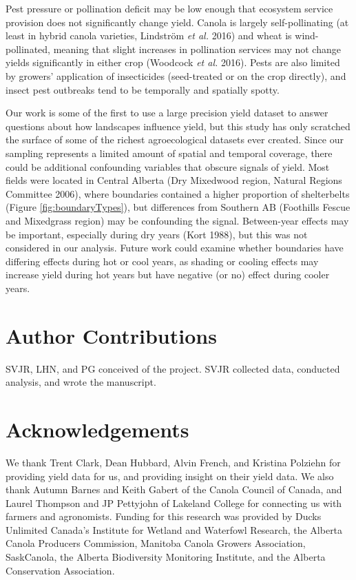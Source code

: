\documentclass[]{elsarticle} %
\begin{document}
Pest pressure or pollination deficit may be low enough that ecosystem service provision does not significantly change yield.
Canola is largely self-pollinating (at least in hybrid canola varieties, Lindström \emph{et al.} 2016) and wheat is wind-pollinated, meaning that slight increases in pollination services may not change yields significantly in either crop (Woodcock \emph{et al.} 2016).
Pests are also limited by growers' application of insecticides (seed-treated or on the crop directly), and insect pest outbreaks tend to be temporally and spatially spotty.

Our work is some of the first to use a large precision yield dataset to answer questions about how landscapes influence yield, but this study has only scratched the surface of some of the richest agroecological datasets ever created.
Since our sampling represents a limited amount of spatial and temporal coverage, there could be additional confounding variables that obscure signals of yield.
Most fields were located in Central Alberta (Dry Mixedwood region, Natural Regions Committee 2006), where boundaries contained a higher proportion of shelterbelts (Figure \ref{fig:boundaryTypes}), but differences from Southern AB (Foothills Fescue and Mixedgrass region) may be confounding the signal.
Between-year effects may be important, especially during dry years (Kort 1988), but this was not considered in our analysis.
Future work could examine whether boundaries have differing effects during hot or cool years, as shading or cooling effects may increase yield during hot years but have negative (or no) effect during cooler years.

\hypertarget{author-contributions}{%
\section{Author Contributions}\label{author-contributions}}

SVJR, LHN, and PG conceived of the project.
SVJR collected data, conducted analysis, and wrote the manuscript.

\hypertarget{acknowledgements}{%
\section{Acknowledgements}\label{acknowledgements}}

We thank Trent Clark, Dean Hubbard, Alvin French, and Kristina Polziehn for providing yield data for us, and providing insight on their yield data.
We also thank Autumn Barnes and Keith Gabert of the Canola Council of Canada, and Laurel Thompson and JP Pettyjohn of Lakeland College for connecting us with farmers and agronomists.
Funding for this research was provided by Ducks Unlimited Canada's Institute for Wetland and Waterfowl Research, the Alberta Canola Producers Commission, Manitoba Canola Growers Association, SaskCanola, the Alberta Biodiversity Monitoring Institute, and the Alberta Conservation Association.
\end{document}
